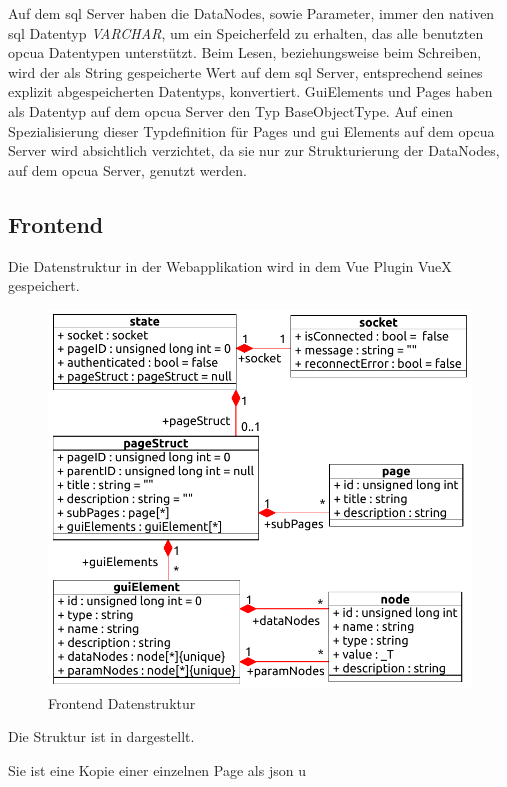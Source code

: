 Auf dem \ac{sql} Server haben die DataNodes, sowie Parameter, immer den nativen \ac{sql} Datentyp \emph{VARCHAR}, um ein Speicherfeld zu erhalten, das alle benutzten \ac{opcua} Datentypen unterstützt.
Beim Lesen, beziehungsweise beim Schreiben, wird der als String gespeicherte Wert auf dem \ac{sql} Server, 
entsprechend seines explizit abgespeicherten Datentyps, konvertiert. 
GuiElements und Pages haben als Datentyp auf dem \ac{opcua} Server den Typ BaseObjectType.
Auf einen Spezialisierung dieser Typdefinition für Pages und \ac{gui} Elements auf dem \ac{opcua} Server wird absichtlich verzichtet, 
da sie nur zur Strukturierung der DataNodes, auf dem \ac{opcua} Server, genutzt werden.


\subsection{Frontend}\label{subsec:dataFrontend}
Die Datenstruktur in der Webapplikation wird in dem Vue Plugin VueX gespeichert.
\begin{figure}[ht]
  \centering
  \includegraphics[width=\textwidth]{content/hauptteil/systemEntwurf/res/structureFrontend.pdf}
  \caption[Frontend Datenstruktur]{Frontend Datenstruktur}
  \label{fig:structFrontendState}
\end{figure} 
Die Struktur ist in  dargestellt.

Sie ist eine Kopie einer einzelnen Page als \ac{json} u



